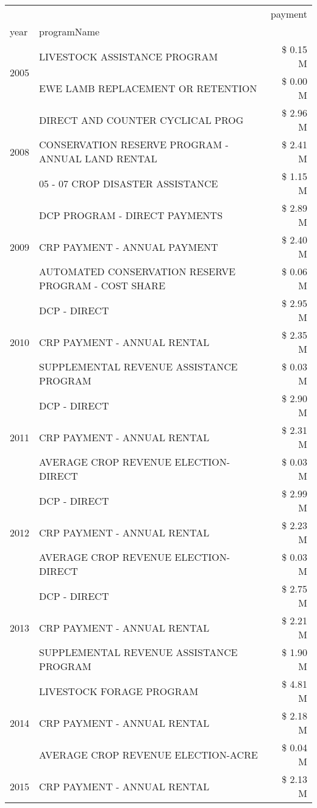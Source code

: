 \begin{tabular}{llr}
\toprule
 &  & payment \\
year & programName &  \\
\midrule
\multirow[t]{2}{*}{2005} & LIVESTOCK ASSISTANCE PROGRAM & \$ 0.15 M \\
 & EWE LAMB REPLACEMENT OR RETENTION & \$ 0.00 M \\
\cline{1-3}
\multirow[t]{3}{*}{2008} & DIRECT AND COUNTER CYCLICAL PROG & \$ 2.96 M \\
 & CONSERVATION RESERVE PROGRAM - ANNUAL LAND RENTAL & \$ 2.41 M \\
 & 05 - 07 CROP DISASTER ASSISTANCE & \$ 1.15 M \\
\cline{1-3}
\multirow[t]{3}{*}{2009} & DCP PROGRAM - DIRECT PAYMENTS & \$ 2.89 M \\
 & CRP PAYMENT - ANNUAL PAYMENT & \$ 2.40 M \\
 & AUTOMATED CONSERVATION RESERVE PROGRAM - COST SHARE & \$ 0.06 M \\
\cline{1-3}
\multirow[t]{3}{*}{2010} & DCP - DIRECT & \$ 2.95 M \\
 & CRP PAYMENT - ANNUAL RENTAL & \$ 2.35 M \\
 & SUPPLEMENTAL REVENUE ASSISTANCE PROGRAM & \$ 0.03 M \\
\cline{1-3}
\multirow[t]{3}{*}{2011} & DCP - DIRECT & \$ 2.90 M \\
 & CRP PAYMENT - ANNUAL RENTAL & \$ 2.31 M \\
 & AVERAGE CROP REVENUE ELECTION-DIRECT & \$ 0.03 M \\
\cline{1-3}
\multirow[t]{3}{*}{2012} & DCP - DIRECT & \$ 2.99 M \\
 & CRP PAYMENT - ANNUAL RENTAL & \$ 2.23 M \\
 & AVERAGE CROP REVENUE ELECTION-DIRECT & \$ 0.03 M \\
\cline{1-3}
\multirow[t]{3}{*}{2013} & DCP - DIRECT & \$ 2.75 M \\
 & CRP PAYMENT - ANNUAL RENTAL & \$ 2.21 M \\
 & SUPPLEMENTAL REVENUE ASSISTANCE PROGRAM & \$ 1.90 M \\
\cline{1-3}
\multirow[t]{3}{*}{2014} & LIVESTOCK FORAGE PROGRAM & \$ 4.81 M \\
 & CRP PAYMENT - ANNUAL RENTAL & \$ 2.18 M \\
 & AVERAGE CROP REVENUE ELECTION-ACRE & \$ 0.04 M \\
\cline{1-3}
\multirow[t]{3}{*}{2015} & CRP PAYMENT - ANNUAL RENTAL & \$ 2.13 M \\

\end{tabular}
